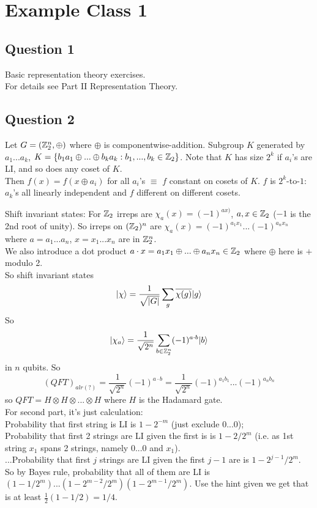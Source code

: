 \documentclass[a4paper]{article}
\begin{document}
\newpage

\section{Example Class 1}

\subsection{Question 1}
Basic representation theory exercises.\\
For details see Part II Representation Theory.

\subsection{Question 2}
Let $G=(\mathbb{Z}_2^n, \oplus)$ where $\oplus$ is componentwise-addition. Subgroup $K$ generated by $a_1...a_k$, $K=\{b_1a_1 \oplus ... \oplus b_ka_k:b_1,...,b_k \in \mathbb{Z}_2\}$. Note that $K$ has size $2^k$ if $a_i$'s are LI, and so does any coset of $K$.\\
Then $f(x) = f(x \oplus a_i)$ for all $a_i$'s $\equiv$ $f$ constant on cosets of $K$. $f$ is $2^k$-to-$1$: $a_k$'s all linearly independent and $f$ different on different cosets.

Shift invariant states: For $\mathbb{Z}_2$ irreps are $\chi_a(x) = (-1)^{ax)}$, $a,x \in \mathbb{Z}_2$ ($-1$ is the 2nd root of unity). So irreps on $(\mathbb{Z}_2)^n$ are $\chi_a(x) =(-1)^{a_1x_1} ... (-1)^{a_nx_n}$ where $a=a_1...a_n$, $x=x_1...x_n$ are in $\mathbb{Z}_2^n$.\\
We also introduce a dot product $a \cdot x = a_1x_1 \oplus ... \oplus a_n x_n \in \mathbb{Z}_2$ where $\oplus$ here is $+$ modulo 2.\\
So shift invariant states
$$|\chi\rangle = \frac{1}{\sqrt{|G|}} \sum_g \overline{\chi(g)} |g\rangle$$
So
$$|\chi_a\rangle = \frac{1}{\sqrt{2^n}} \sum_{b \in \mathbb{Z}_2^n} (-1)^{a\cdot b} |b\rangle$$
in $n$ qubits. So
$$(QFT)_{alr(?)} = \frac{1}{\sqrt{2^n}} (-1)^{a \cdot b} = \frac{1}{\sqrt{2^n}} (-1)^{a_1b_1}...(-1)^{a_nb_n}$$
so $QFT = H \otimes H \otimes ... \otimes H$ where $H$ is the Hadamard gate.\\
For second part, it's just calculation:\\
Probability that first string is LI is $1-2^{-m}$ (just exclude $0...0$);\\
Probability that first 2 strings are LI given the first is is $1-2/2^m$ (i.e. as 1st string $x_1$ spans 2 strings, namely $0...0$ and $x_1$).\\
...Probability that first $j$ strings are LI given the first $j-1$ are is $1-2^{j-1}/2^m$.\\
So by Bayes rule, probability that all of them are LI is $(1-1/2^m)...(1-2^{m-2}/2^m)(1-2^{m-1}/2^m)$. Use the hint given we get that is at least $\frac{1}{2}(1-1/2) =1/4$.
\end{document}
